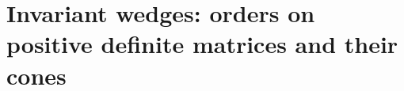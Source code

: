 %

\section{Invariant wedges: orders on positive definite matrices and their cones}
\label{sec:invariant-wedges}

